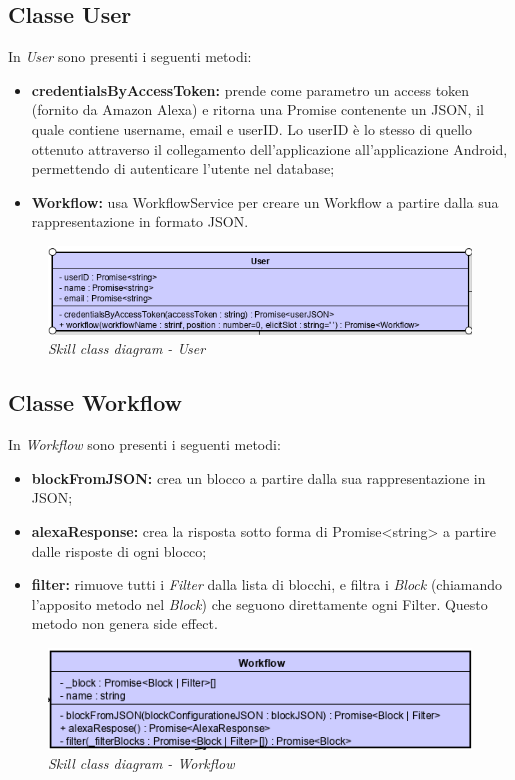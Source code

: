 \subsection{Classe User}
In \textit{User} sono presenti i seguenti metodi:
\begin{itemize}
    \item \textbf{credentialsByAccessToken:} prende come parametro un access token (fornito da Amazon Alexa) e ritorna una Promise contenente un JSON, il quale contiene username, email e userID. Lo userID è lo stesso di quello ottenuto attraverso il collegamento dell'applicazione all'applicazione Android, permettendo di autenticare l'utente nel database;
    \item \textbf{Workflow:} usa WorkflowService per creare un Workflow a partire dalla sua rappresentazione in formato JSON.
\end{itemize}
\begin{figure} [H]
    \centering
	\includegraphics[scale=0.8]{./images/user.PNG}
	\caption{\textit{Skill class diagram - User}}\label{classlambda}
\end{figure}
\subsection{Classe Workflow}
In \textit{Workflow} sono presenti i seguenti metodi:
\begin{itemize}
    \item \textbf{blockFromJSON:} crea un blocco a partire dalla sua rappresentazione in JSON;
    \item \textbf{alexaResponse:} crea la risposta sotto forma di Promise<string> a partire dalle risposte di ogni blocco;
    \item \textbf{filter:} rimuove tutti i \textit{Filter} dalla lista di blocchi, e filtra i \textit{Block} (chiamando l'apposito metodo nel \textit{Block}) che seguono direttamente ogni Filter. Questo metodo non genera side effect.
\end{itemize}
\begin{figure} [H]
    \centering
	\includegraphics[scale=0.8]{./images/workflow.PNG}
	\caption{\textit{Skill class diagram - Workflow}}\label{classlambda}
\end{figure}
